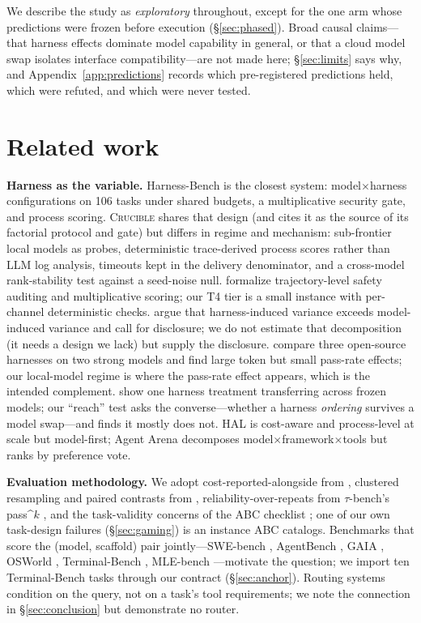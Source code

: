 \documentclass[10pt]{article}
\newcommand{\crucible}{\textsc{Crucible}}
\begin{document}
We describe the study as \emph{exploratory} throughout, except for the one arm whose predictions
were frozen before execution (\S\ref{sec:phased}). Broad causal claims---that harness effects
dominate model capability in general, or that a cloud model swap isolates interface
compatibility---are not made here; \S\ref{sec:limits} says why, and Appendix~\ref{app:predictions}
records which pre-registered predictions held, which were refuted, and which were never tested.

\section{Related work}
\label{sec:related}

\textbf{Harness as the variable.} Harness-Bench \citep{harnessbench} is the closest system:
model$\times$harness configurations on 106 tasks under shared budgets, a multiplicative security
gate, and process scoring. \crucible{} shares that design (and cites it as the source of its
factorial protocol and gate) but differs in regime and mechanism: sub-frontier local models as
probes, deterministic trace-derived process scores rather than LLM log analysis, timeouts kept in
the delivery denominator, and a cross-model rank-stability test against a seed-noise null.
\citet{harnessaudit} formalize trajectory-level safety auditing and multiplicative scoring; our T4
tier is a small instance with per-channel deterministic checks. \citet{stopcomparing} argue that
harness-induced variance exceeds model-induced variance and call for disclosure; we do not estimate
that decomposition (it needs a design we lack) but supply the disclosure. \citet{scaffoldeffect}
compare three open-source harnesses on two strong models and find large token but small pass-rate
effects; our local-model regime is where the pass-rate effect appears, which is the intended
complement. \citet{samemodel} show one harness treatment transferring across frozen models; our
``reach'' test asks the converse---whether a harness \emph{ordering} survives a model swap---and
finds it mostly does not. HAL \citep{hal} is cost-aware and process-level at scale but model-first;
Agent Arena decomposes model$\times$framework$\times$tools but ranks by preference vote.

\textbf{Evaluation methodology.} We adopt cost-reported-alongside from \citet{aiagents}, clustered
resampling and paired contrasts from \citet{errorbars}, reliability-over-repeats from $\tau$-bench's
pass\textasciicircum{}$k$ \citep{taubench}, and the task-validity concerns of the ABC checklist
\citep{abc}; one of our own task-design failures (\S\ref{sec:gaming}) is an instance ABC catalogs.
Benchmarks that score the (model, scaffold) pair jointly---SWE-bench \citep{swebench}, AgentBench
\citep{agentbench}, GAIA \citep{gaia}, OSWorld \citep{osworld}, Terminal-Bench
\citep{terminalbench}, MLE-bench \citep{mlebench}---motivate the question; we import ten
Terminal-Bench tasks through our contract (\S\ref{sec:anchor}). Routing systems
\citep{routellm,frugalgpt,hybridllm} condition on the query, not on a task's tool requirements; we
note the connection in \S\ref{sec:conclusion} but demonstrate no router.
\end{document}
